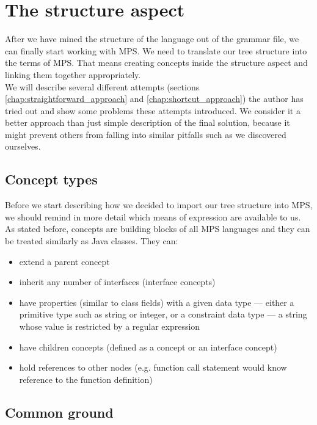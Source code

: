 \section{The structure aspect}

After we have mined the structure of the language out of the grammar file, we can finally start working with MPS.
We need to translate our tree structure into the terms of MPS.
That means creating concepts inside the structure aspect and linking them together appropriately.
\\

We will describe several different attempts (sections \ref{chap:straightforward_approach} and \ref{chap:shortcut_approach}) the author has tried out and show some problems these attempts introduced.
We consider it a better approach than just simple description of the final solution, because it might prevent others from falling into similar pitfalls such as we discovered ourselves.


\subsection{Concept types}

Before we start describing how we decided to import our tree structure into MPS, we should remind in more detail which means of expression are available to us.
As stated before, concepts are building blocks of all MPS languages and they can be treated similarly as Java classes.
They can:

\begin{itemize}
	\item extend a parent concept
	\item inherit any number of interfaces (interface concepts)
	\item have properties (similar to class fields) with a given data type --- either a primitive type such as string or integer, or a constraint data type --- a string whose value is restricted by a regular expression
	\item have children concepts (defined as a concept or an interface concept)
	\item hold references to other nodes (e.g. function call statement would know reference to the function definition)
\end{itemize}

\subsection{Common ground}

